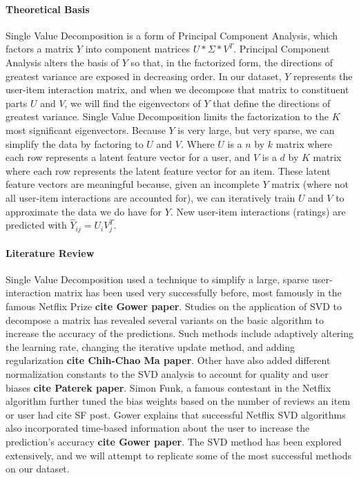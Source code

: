 \documentclass[12pt]{article}
\begin{document}
\paragraph{Theoretical Basis} Single Value Decomposition is a form of Principal Component Analysis, which factors a matrix $Y$ into component matrices $U * \Sigma * V^{T}$. Principal Component Analysis alters the basis of $Y$ so that, in the factorized form, the directions of greatest variance are exposed in decreasing order. In our dataset, $Y$ represents the user-item interaction matrix, and when we decompose that matrix to constituent parts $U$ and $V$, we will find the eigenvectors of $Y$ that define the directions of greatest variance. Single Value Decomposition limits the factorization to the $K$ most significant eigenvectors. Because $Y$ is very large, but very sparse, we can simplify the data by factoring to $U$ and $V$. Where $U$ is a $n$ by $k$ matrix where each row represents a latent feature vector for a user, and $V$ is a $d$ by $K$ matrix where each row represents the latent feature vector for an item. These latent feature vectors are meaningful because, given an incomplete $Y$ matrix (where not all user-item interactions are accounted for), we can iteratively train $U$ and $V$ to approximate the data we do have for $Y$. New user-item interactions (ratings) are predicted with $\hat{Y}_{ij} = U_{i}V_{j}^{T}$.

\paragraph{Literature Review} Single Value Decomposition used a technique to simplify a large, sparse user-interaction matrix has been used very successfully before, most famously in the famous Netflix Prize \textbf{cite Gower paper}. Studies on the application of SVD to decompose a matrix has revealed several variants on the basic algorithm to increase the accuracy of the predictions. Such methods include adaptively altering the learning rate, changing the iterative update method, and adding regularization \textbf{cite Chih-Chao Ma paper}. Other have also added different normalization constants to the SVD analysis to account for quality and user biases \textbf{cite Paterek paper}. Simon Funk, a famous contestant in the Netflix algorithm further tuned the bias weights based on the number of reviews an item or user had {cite SF post}. Gower explains that successful Netflix SVD algorithms also incorporated time-based information about the user to increase the prediction's accuracy \textbf{cite Gower paper}. The SVD method has been explored extensively, and we will attempt to replicate some of the most successful methods on our dataset.
\end{document}
